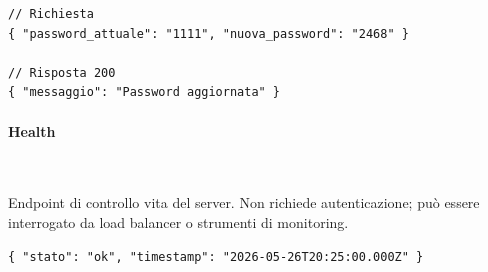 \begin{lstlisting}[style=json]
// Richiesta
{ "password_attuale": "1111", "nuova_password": "2468" }

// Risposta 200
{ "messaggio": "Password aggiornata" }
\end{lstlisting}

\paragraph{Health}\mbox{}\\


Endpoint di controllo vita del server. Non richiede autenticazione; può essere
interrogato da load balancer o strumenti di monitoring.

\begin{lstlisting}[style=json]
{ "stato": "ok", "timestamp": "2026-05-26T20:25:00.000Z" }
\end{lstlisting}